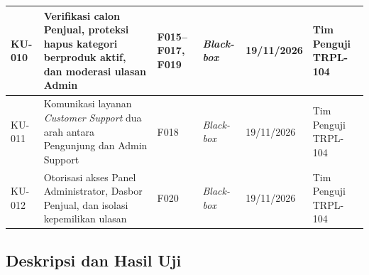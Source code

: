 \begin{longtable}{|C{1.55cm}|L{\dimexpr\textwidth-1.55cm-2.0cm-1.7cm-2.1cm-2.3cm-12\arrayrulewidth\relax}|C{2.0cm}|C{1.7cm}|C{2.1cm}|L{2.3cm}|}
\hline
KU-010 & Verifikasi calon Penjual, proteksi hapus kategori berproduk aktif, dan moderasi ulasan Admin & F015--F017, F019 & \textit{Black-box} & 19/11/2026 & Tim Penguji TRPL-104 \\
\hline
KU-011 & Komunikasi layanan \textit{Customer Support} dua arah antara Pengunjung dan Admin Support & F018 & \textit{Black-box} & 19/11/2026 & Tim Penguji TRPL-104 \\
\hline
KU-012 & Otorisasi akses Panel Administrator, Dasbor Penjual, dan isolasi kepemilikan ulasan & F020 & \textit{Black-box} & 19/11/2026 & Tim Penguji TRPL-104 \\
\hline
\end{longtable}

\subsection{Deskripsi dan Hasil Uji}

\newcommand{\printtestcase}[9]{%
\needspace{9cm}
\noindent
\renewcommand{\arraystretch}{1.20}
\begin{tabularx}{\textwidth}{|L{3.2cm}|Y|Y|}
\hline
\rowcolor{TableHeadBg}
\textbf{Identifikasi} & \multicolumn{2}{l|}{\textbf{#1}} \\
\hline
\textbf{Nama Kasus Uji} & \multicolumn{2}{>{\raggedright\arraybackslash}p{\dimexpr\textwidth-3.2cm-4\tabcolsep-3\arrayrulewidth\relax}|}{#2} \\
\hline
\textbf{Deskripsi} & \multicolumn{2}{>{\raggedright\arraybackslash}p{\dimexpr\textwidth-3.2cm-4\tabcolsep-3\arrayrulewidth\relax}|}{#3} \\
\hline
\textbf{Kondisi Awal} & \multicolumn{2}{>{\raggedright\arraybackslash}p{\dimexpr\textwidth-3.2cm-4\tabcolsep-3\arrayrulewidth\relax}|}{#4} \\
\hline
\textbf{Tanggal Pengujian} & \multicolumn{2}{l|}{#5} \\
\hline
\textbf{Penguji} & \multicolumn{2}{l|}{#6} \\
\hline
\rowcolor{RowShade}
\multicolumn{3}{|c|}{\textbf{Skenario Pengujian}} \\
\hline
\multicolumn{3}{|>{\raggedright\arraybackslash}p{\dimexpr\textwidth-2\tabcolsep-2\arrayrulewidth\relax}|}{#7} \\
\hline
\rowcolor{TableHeadBg}
\textbf{Hasil yang Diharapkan} & \textbf{Hasil Pengamatan} & \textbf{Kesimpulan} \\
\hline
#8 & #9 & \textbf{\color{JajanGreen}Sesuai (PASS)} \\
\hline
\end{tabularx}
\vspace{0.35cm}
}

